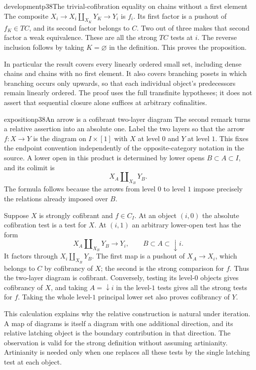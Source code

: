 \begin{dcomment}{development}{p38}{The trivial-cofibration equality on chains without a first element}
The composite $X_i\to X_i\amalg_{X_K}Y_K\to Y_i$ is $f_i$. Its first factor is a pushout of $f_K\in TC$, and its second factor belongs to $C$. Two out of three makes that second factor a weak equivalence. These are all the strong $TC$ tests at $i$. The reverse inclusion follows by taking $K=\varnothing$ in the definition. This proves the proposition.

In particular the result covers every linearly ordered small set, including dense chains and chains with no first element. It also covers branching posets in which branching occurs only upwards, so that each individual object's predecessors remain linearly ordered. The proof uses the full transfinite hypotheses; it does not assert that sequential closure alone suffices at arbitrary cofinalities.
\end{dcomment}

\begin{dcomment}{exposition}{p38}{An arrow is a cofibrant two-layer diagram}
The second remark turns a relative assertion into an absolute one. Label the two layers so that the arrow $f:X\to Y$ is the diagram on $I\times[1]$ with $X$ at level $0$ and $Y$ at level $1$. This fixes the endpoint convention independently of the opposite-category notation in the source. A lower open in this product is determined by lower opens $B\subset A\subset I$, and its colimit is
\[
 X_A\amalg_{X_B}Y_B.
\]
The formula follows because the arrows from level $0$ to level $1$ impose precisely the relations already imposed over $B$.

Suppose $X$ is strongly cofibrant and $f\in C_I$. At an object $(i,0)$ the absolute cofibration test is a test for $X$. At $(i,1)$ an arbitrary lower-open test has the form
\[
 X_A\amalg_{X_B}Y_B\longrightarrow Y_i,
 \qquad B\subset A\subset\downarrow i.
\]
It factors through $X_i\amalg_{X_B}Y_B$. The first map is a pushout of $X_A\to X_i$, which belongs to $C$ by cofibrancy of $X$; the second is the strong comparison for $f$. Thus the two-layer diagram is cofibrant. Conversely, testing its level-$0$ objects gives cofibrancy of $X$, and taking $A=\downarrow i$ in the level-$1$ tests gives all the strong tests for $f$. Taking the whole level-$1$ principal lower set also proves cofibrancy of $Y$.

This calculation explains why the relative construction is natural under iteration. A map of diagrams is itself a diagram with one additional direction, and its relative latching object is the boundary contribution in that direction. The observation is valid for the strong definition without assuming artinianity. Artinianity is needed only when one replaces all these tests by the single latching test at each object.
\end{dcomment}

